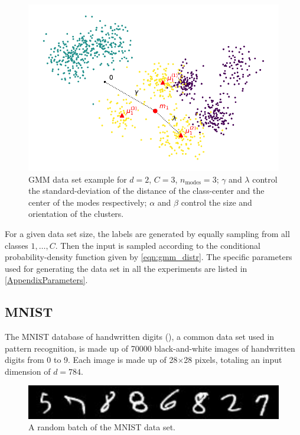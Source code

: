 \begin{figure}[h]
    \centering
    \includegraphics{figures/GMM_plot.pdf}
    \caption{GMM data set example for $d=2$, $C=3$, $n_\text{modes}=3$; 
    $\gamma$ and $\lambda$ control the standard-deviation of the distance of the class-center and the center of the modes respectively; $\alpha$ and $\beta$ control the size and orientation of the clusters.}
    \label{fig:GMM_plot}
\end{figure}

For a given data set size, the labels are generated by equally sampling from all classes $1, \ldots, C$.
Then the input is sampled according to the conditional probability-density function given by \cref{eqn:gmm_distr}.
The specific parameters used for generating the data set in all the experiments
are listed in \cref{AppendixParameters}.


\subsection{MNIST}
The MNIST database of handwritten digits (\cite{MNIST}), a common data set used in pattern recognition, is made up of 70000 black-and-white images 
of handwritten digits from 0 to 9. 
Each image is made up of 28$\times$28 pixels, totaling an input dimension of $d=784$.
\begin{figure}[h]
    \centering
    \includegraphics{figures/MNIST_plot.pdf}
    \caption{A random batch of the MNIST data set.}
    \label{fig:MNIST_plot}
\end{figure}

